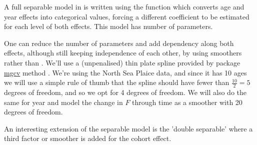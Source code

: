 \documentclass[a4paper,english,11pt]{article}
\begin{document}
A full separable model in \aFa is written using the  function which converts age and year effects into categorical values, forcing a different coefficient to be estimated for each level of both effects. This model has  number of parameters.

\begin{knitrout}
\color{fgcolor}\begin{kframe}
\begin{alltt}
 \hlkwb{<-} \hlopt{~} \hlopt{+} 
 \hlkwb{<-}     \hldef{=} \hldef{)}
\end{alltt}
\end{kframe}
\end{knitrout}

One can reduce the number of parameters and add dependency along both effects, although still keeping independence of each other, by using smoothers rather than . We'll use a (unpenalised) thin plate spline provided by package \href{http://cran.r-project.org/web/packages/mgcv/}{mgcv} method . We're using the North Sea Plaice data, and since it has 10 ages we will use a simple rule of thumb that the spline should have fewer than $\frac{10}{2} = 5$ degrees of freedom, and so we opt for 4 degrees of freedom. We will also do the same for year and model the change in $F$ through time as a smoother with 20 degrees of freedom.

\begin{knitrout}
\color{fgcolor}\begin{kframe}
\begin{alltt}
 \hlkwb{<-} \hlopt{~}  \hldef{=} \hldef{)} \hlopt{+}   \hldef{=} \hldef{)}
 \hlkwb{<-}     \hldef{=} \hldef{)}
\end{alltt}
\end{kframe}
\end{knitrout}

An interesting extension of the separable model is the 'double separable' where a third factor or smoother is added for the cohort effect.
\end{document}
